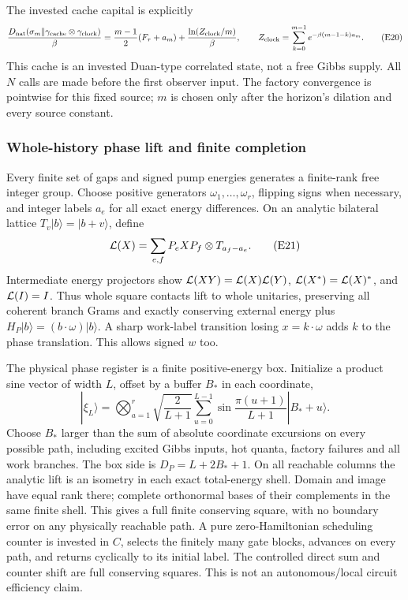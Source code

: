 The invested cache capital is explicitly
\[
 \frac{D_{\mathrm{nat}}(\sigma_m\|\gamma_{\rm cache}\otimes\gamma_{\rm clock})}{\beta}
 =\frac{m-1}{2}(F_\tau+a_m)
   +\frac{\ln(Z_{\rm clock}/m)}{\beta},\qquad
 Z_{\rm clock}=\sum_{k=0}^{m-1}e^{-\beta(m-1-k)a_m}.                \tag{E20}
\]
This cache is an invested Duan-type correlated state, not a free
Gibbs supply. All \(N\) calls are made before the first observer input.
The factory convergence is pointwise for this fixed source; \(m\)
is chosen only after the horizon's dilation and every source constant.

\subsubsection{Whole-history phase lift and finite completion}
Every finite set of gaps and signed pump energies generates a
finite-rank free integer group. Choose positive generators
\(\omega_1,\ldots,\omega_r\), flipping signs when necessary, and integer
labels \(a_e\) for all exact energy differences.
On an analytic bilateral lattice \(T_v|b\rangle=|b+v\rangle\), define
\[
 {\cal L}(X)=\sum_{e,f}P_eXP_f\otimes T_{a_f-a_e}.     \tag{E21}
\]
Intermediate energy projectors show
\({\cal L}(XY)={\cal L}(X){\cal L}(Y)\),
\({\cal L}(X^*)={\cal L}(X)^*\), and \({\cal L}(I)=I\).
Thus whole square contacts lift to whole unitaries, preserving all
coherent branch Grams and exactly conserving external energy plus
\(H_P|b\rangle=(b\cdot\omega)|b\rangle\).
A sharp work-label transition losing \(x=k\cdot\omega\) adds \(k\)
to the phase translation. This allows signed \(w\) too.

The physical phase register is a finite positive-energy box.
Initialize a product sine vector of width \(L\), offset by a buffer
\(B_*\) in each coordinate,
\[
 |\xi_L\rangle=\bigotimes_{a=1}^r
 \sqrt{\frac2{L+1}}\sum_{u=0}^{L-1}
 \sin\frac{\pi(u+1)}{L+1}|B_*+u\rangle.
\]
Choose \(B_*\) larger than the sum of absolute coordinate excursions
on every possible path, including excited Gibbs inputs, hot
quanta, factory failures and all work branches. The box side is
\(D_P=L+2B_*+1\).
On all reachable columns the analytic lift is an isometry in each
exact total-energy shell. Domain and image have equal rank there;
complete orthonormal bases of their complements in the same finite
shell. This gives a full finite conserving square, with no boundary
error on any physically reachable path.
A pure zero-Hamiltonian scheduling counter is invested in \(C\), selects the
finitely many gate blocks, advances on every path, and returns
cyclically to its initial label. The controlled direct sum and counter
shift are full conserving squares. This is not an autonomous/local
circuit efficiency claim.

